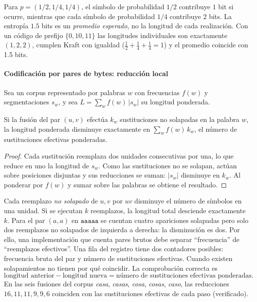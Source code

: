 \begin{ejemplo}
Para $p=(1/2,1/4,1/4)$, el símbolo de probabilidad $1/2$ contribuye
$1$ bit si ocurre, mientras que cada símbolo de probabilidad $1/4$
contribuye $2$ bits. La entropía $1.5$ bits es un \emph{promedio esperado},
no la longitud de cada realización. Con un código de prefijo
$\{0,10,11\}$ las longitudes individuales son exactamente $(1,2,2)$,
cumplen Kraft con igualdad ($\frac12+\frac14+\frac14=1$)
y el promedio coincide con 1.5 bits.
\end{ejemplo}

\paragraph{Codificación por pares de bytes: reducción local}
Sea un corpus representado por palabras $w$ con frecuencias $f(w)$ y
segmentaciones $s_w$, y sea $L=\sum_wf(w)\,|s_w|$ su longitud ponderada.
\begin{proposicion}\label{s01:prop:bpe}
Si la fusión del par $(u,v)$ efectúa $k_w$ sustituciones no solapadas en la
palabra $w$, la longitud ponderada disminuye exactamente en
$\sum_wf(w)\,k_w$, el número de sustituciones efectivas ponderadas.
\end{proposicion}
\begin{proof}
Cada sustitución reemplaza dos unidades consecutivas por una, lo que reduce en uno
la longitud de $s_w$. Como las sustituciones no se solapan, actúan sobre posiciones
disjuntas y sus reducciones se suman: $|s_w|$ disminuye en $k_w$. Al ponderar por
$f(w)$ y sumar sobre las palabras se obtiene el resultado.
\end{proof}
Cada reemplazo \emph{no solapado} de $u,v$ por $uv$ disminuye
el número de símbolos en una unidad. Si se ejecutan $k$ reemplazos,
la longitud total desciende exactamente $k$. Para el par $(a,a)$ en
$\texttt{aaaaa}$ se cuentan cuatro apariciones solapadas pero solo dos
reemplazos no solapados de izquierda a derecha: la disminución es dos.
Por ello, una implementación que cuenta pares brutos debe separar
``frecuencia'' de ``reemplazos efectivos''.
Una fila del registro tiene dos contadores posibles: frecuencia bruta
del par y número de sustituciones efectivas. Cuando existen
solapamientos no tienen por qué coincidir. La comprobación correcta es
\[
\text{longitud anterior}-\text{longitud nueva}
=\text{número de sustituciones efectivas ponderadas}.
\]
En las seis fusiones del corpus \emph{casa}, \emph{casas}, \emph{cosa},
\emph{cosas}, \emph{caso}, las reducciones $16,11,11,9,9,6$ coinciden con las
sustituciones efectivas de cada paso (verificado).

